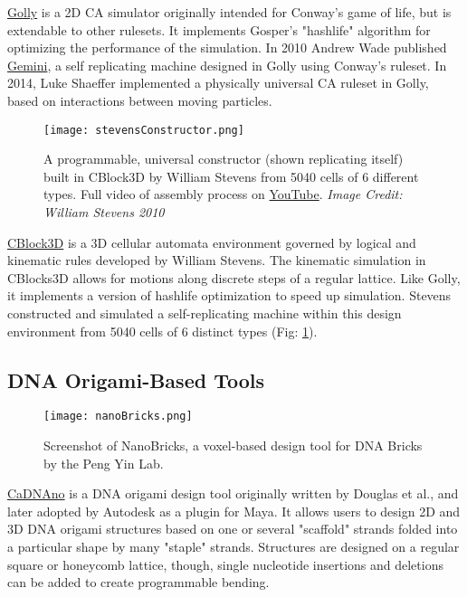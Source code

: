 {\href{http://golly.sourceforge.net/}{Golly} is a 2D CA simulator originally intended for Conway's game of life, but is extendable to other rulesets.  It implements Gosper's "hashlife" algorithm for optimizing the performance of the simulation\cite{Gosper1984}.  In 2010 Andrew Wade published \href{https://www.youtube.com/watch?v=A8B5MbHPlH0}{Gemini}, a self replicating machine designed in Golly using Conway's ruleset.  In 2014, Luke Shaeffer implemented a physically universal CA ruleset in Golly, based on interactions between moving particles\cite{Shaffer2014}.\\

\begin{figure}
  \texttt{[image: stevensConstructor.png]}
  \caption{A programmable, universal constructor (shown replicating itself) built in CBlock3D by William Stevens from 5040 cells of 6 different types\cite{Stevens2009b}.  Full video of assembly process on  \href{https://www.youtube.com/watch?v=PBXO_6Jn1fs}{YouTube}. \textit{Image Credit: William Stevens 2010}}
  \label{fig:stevensConstructor}
\end{figure}
\href{https://www.youtube.com/watch?feature=player_embedded&v=PBXO_6Jn1fs}{CBlock3D} is a 3D cellular automata environment governed by logical and kinematic rules developed by William Stevens\cite{Stevens2007}\cite{Stevens2009}.  The kinematic simulation in CBlocks3D allows for motions along discrete steps of a regular lattice.  Like Golly, it implements a version of hashlife optimization\cite{Stevens2010} to speed up simulation.  Stevens constructed and simulated a self-replicating machine within this design environment from 5040 cells of 6 distinct types (Fig: \ref{fig:stevensConstructor})\cite{Stevens2009b}.
\\

\subsection{DNA Origami-Based Tools}

\begin{figure}
  \texttt{[image: nanoBricks.png]}
  \caption{Screenshot of NanoBricks, a voxel-based design tool for DNA Bricks by the Peng Yin Lab.}
  \label{fig:nanoBricks}
\end{figure}

\href{http://cadnano.org/}{CaDNAno} is a DNA origami design tool originally written by Douglas et al.\cite{Douglas2009}, and later adopted by Autodesk as a plugin for Maya.  It allows users to design 2D and 3D DNA origami structures based on one or several "scaffold" strands folded into a particular shape by many "staple" strands.  Structures are designed on a regular square or honeycomb lattice, though, single nucleotide insertions and deletions can be added to create programmable bending\cite{Dietz2009}\cite{Kim2012}.\\

}
